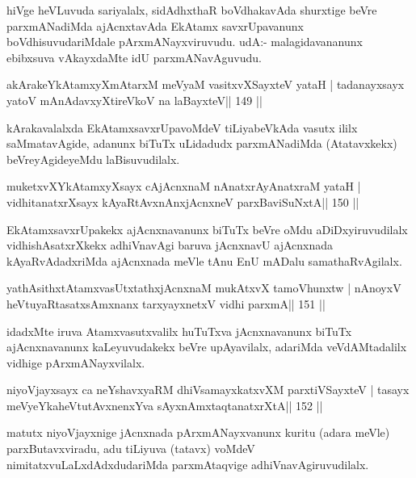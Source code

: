\begin{artha}
hiVge heVLuvuda sariyalalx, sidAdhxthaR boVdhakavAda shurxtige beVre parxmANa\-diMda ajAcnxtavAda EkAtamx savxrUpavanunx boVdhisuvudariMdale pArxmANayx\-viruvudu. udA:- malagidavananunx ebibxsuva vAkayxdaMte idU parxmANavAguvudu.
\end{artha}

\begin{shl}
akArakeYkAtamxyXmAtarxM meVyaM vasitxvXSayxteV yataH |
tadanayxsayx yatoV mAnAdavxyXtireVkoV na laBayxteV\hfill || 149 ||
\end{shl}

\begin{artha}
kArakavalalxda EkAtamxsavxrUpavoMdeV tiLiyabeVkAda vasutx ililx saMmatavAgide, adanunx biTuTx uLidadudx parxmANadiMda (Atatavxkekx) beVreyAgideyeMdu laBisuvu\-dilalx.
\end{artha}

\begin{shl}
muketxvXYkAtamxyXsayx cAjAcnxnaM nAnatxrAyAnatxraM yataH |
vidhitanatxrXsayx kAyaRtAvxnAnxjAcnxneV parxBaviSuNxtA\hfill || 150 ||
\end{shl}

\begin{artha}
EkAtamxsavxrUpakekx ajAcnxnavanunx biTuTx beVre oMdu aDiDxyiruvudilalx vidhishAsatxrXkekx adhiVnavAgi baruva jAcnxnavU ajAcnxnada kAyaRvAdadxriMda ajAcnxnada meVle tAnu EnU mADalu samathaRvAgilalx.
\end{artha}

\begin{shl}
yathAsithxtAtamxvasUtxtathxjAcnxnaM mukAtxvX tamoVhunxtw |
nAnoyxV heVtuyaRtasatxsAmxnanx tarxyayxnetxV vidhi parxmA\hfill || 151 ||
\end{shl}

\begin{artha}
idadxMte iruva Atamxvasutxvalilx huTuTxva jAcnxnavanunx biTuTx ajAcnxnavanunx kaLeyuvudakekx beVre upAyavilalx, adariMda veVdAMtadalilx vidhige pArxmANayxvilalx.
\end{artha}

\begin{shl}
niyoVjayxsayx ca neYshavxyaRM dhiVsamayxkatxvXM parxtiVSayxteV |
tasayx meVyeYkaheVtutAvxnenxYva sAyxnAmxtaqtanatxrXtA\hfill || 152 ||
\end{shl}

\begin{artha}
matutx niyoVjayxnige jAcnxnada pArxmANayxvanunx kuritu (adara meVle) parxButavx\-viradu, adu tiLiyuva (tatavx) voMdeV nimitatxvuLaLxdAdxdudariMda parxmAtaqvige adhiVnavAgiruvudilalx.
\end{artha}

